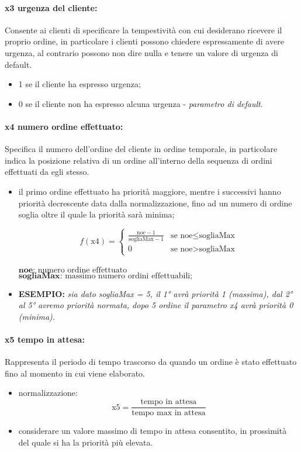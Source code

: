 \paragraph{x3 urgenza del cliente:}
Consente ai clienti di specificare la tempestività con cui desiderano ricevere il proprio ordine, in particolare i clienti possono chiedere espressamente di avere urgenza, al contrario possono non dire nulla e tenere un valore di urgenza di default.
\begin{itemize}
	\item 1 se il cliente ha espresso urgenza;
	\item 0 se il cliente non ha espresso alcuna urgenza - \textit{parametro di default}.
\end{itemize}

\paragraph{x4 numero ordine effettuato:}
Specifica il numero dell’ordine del cliente in ordine temporale, in particolare indica la posizione relativa di un ordine all'interno della sequenza di ordini effettuati da egli stesso.
\begin{itemize}
	\item il primo ordine effettuato ha priorità maggiore, mentre i successivi hanno priorità decrescente data dalla normalizzazione, fino ad un numero di ordine soglia oltre il quale la priorità sarà minima;

	\[ f(\text{x4}) = \begin{cases} \frac{{\text{noe} - 1}}{{\text{sogliaMax} - 1}} & \text{se } \text{noe} \leq \text{sogliaMax} \\ 0 & \text{se } \text{noe} > \text{sogliaMax} \end{cases} \]\\

	$\textbf{noe} \text{: numero ordine effettuato}$\\
	$\textbf{sogliaMax} \text{: massimo numero ordini effettuabili;}$

	\item \textbf{ESEMPIO: } \textit{sia dato sogliaMax = 5, il 1° avrà priorità 1 (massima), dal 2° al 5° avremo priorità normata, dopo 5 ordine il parametro x4 avrà priorità 0 (minima).}
\end{itemize}

\paragraph{x5 tempo in attesa:}
Rappresenta il periodo di tempo trascorso da quando un ordine è stato effettuato fino al momento in cui viene elaborato.
\begin{itemize}
	\item normalizzazione: \begin{equation*}
		\text{x5} = \frac{\text{tempo in attesa}}{\text{tempo max in attesa}}
	\end{equation*}
	\item considerare un valore massimo di tempo in attesa consentito, in prossimità del quale si ha la priorità più elevata.
\end{itemize}

